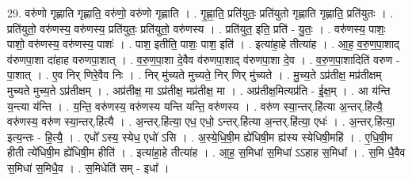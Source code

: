 \documentclass[17pt]{extarticle}
\begin{document}
29. वरु॑णो गृह्णाति गृह्णाति॒ वरु॑णो॒ वरु॑णो गृह्णाति । . गृ॒ह्णा॒ति॒ प्रति॑युतः॒ प्रति॑युतो गृह्णाति गृह्णाति॒ प्रति॑युतः । . प्रति॑युतो॒ वरु॑णस्य॒ वरु॑णस्य॒ प्रति॑युतः॒ प्रति॑युतो॒ वरु॑णस्य । . प्रति॑युत॒ इति॒ प्रति॑ - यु॒तः॒ । . वरु॑णस्य॒ पाशः॒ पाशो॒ वरु॑णस्य॒ वरु॑णस्य॒ पाशः॑ । . पाश॒ इतीति॒ पाशः॒ पाश॒ इति॑ । . इत्या॑हा॒हे तीत्या॑ह । . आ॒ह॒ व॒रु॒ण॒पा॒शाद् व॑रुणपा॒शा दा॑हाह वरुणपा॒शात् । . व॒रु॒ण॒पा॒शा दे॒वैव व॑रुणपा॒शाद् व॑रुणपा॒शा दे॒व । . व॒रु॒ण॒पा॒शादिति॑ वरुण - पा॒शात् । . ए॒व निर् णिरे॒वैव निः । . निर् मु॑च्यते मुच्यते॒ निर् णिर् मु॑च्यते । . मु॒च्य॒ते ऽप्र॑तीक्ष॒ मप्र॑तीक्षम् मुच्यते मुच्य॒ते ऽप्र॑तीक्षम् । . अप्र॑तीक्ष॒ मा ऽप्र॑तीक्ष॒ मप्र॑तीक्ष॒ मा । . अप्र॑तीक्ष॒मित्यप्र॑ति - ई॒क्ष॒म् । . आ य॑न्ति य॒न्त्या य॑न्ति । . य॒न्ति॒ वरु॑णस्य॒ वरु॑णस्य यन्ति यन्ति॒ वरु॑णस्य । . वरु॑ण स्या॒न्तर्.हि॑त्या अ॒न्तर्.हि॑त्यै॒ वरु॑णस्य॒ वरु॑ण स्या॒न्तर्.हि॑त्यै । . अ॒न्तर्.हि॑त्या॒ एध॒ एधो॒ ऽन्तर्.हि॑त्या अ॒न्तर्.हि॑त्या॒ एधः॑ । . अ॒न्तर्.हि॑त्या॒ इत्य॒न्तः - हि॒त्यै॒ । . एधो᳚ ऽस्य॒ स्येध॒ एधो॑ ऽसि । . अ॒स्ये॒धि॒षी॒म ह्ये॑धिषी॒म ह्य॑स्य स्येधिषी॒महि॑ । . ए॒धि॒षी॒म हीती त्ये॑धिषी॒म ह्ये॑धिषी॒म हीति॑ । . इत्या॑हा॒हे तीत्या॑ह । . आ॒ह॒ स॒मिधा॑ स॒मिधा॑ ऽऽहाह स॒मिधा᳚ । . स॒मि धै॒वैव स॒मिधा॑ स॒मिधै॒व । . स॒मिधेति॑ सम् - इधा᳚ । \newline
\end{document}

